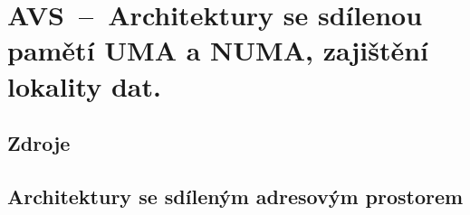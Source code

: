 

\graphicspath{{avs/architektury_se_sdilenou_pameti/figures}}


\chapter{AVS~--~Architektury se sdílenou pamětí UMA a NUMA, zajištění lokality dat.}


\section{Zdroje}

\begin{compactitem}
    \item {}
    \item {}
    \item {}
    \item {}
\end{compactitem}


\section{Architektury se sdíleným adresovým prostorem}

